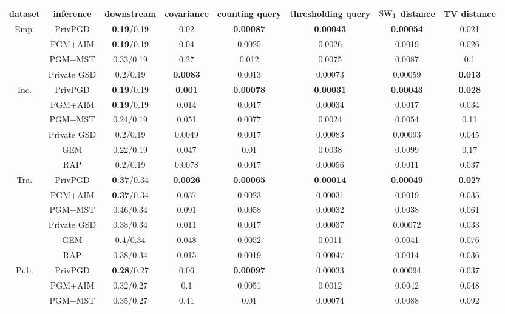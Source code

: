 \begin{table}[ht]
\footnotesize
\centering
\begin{tabular}{cccccccc}
\toprule
dataset & inference & downstream & covariance & counting query & thresholding query & $\text{SW}_1$ distance & TV distance \\
\midrule \multirow{4}{*}{Emp. } & PrivPGD&\textbf{0.19}/0.19 & 0.02 & \textbf{0.00087} & \textbf{0.00043} & \textbf{0.00054} & 0.021 \\
 & PGM+AIM&\textbf{0.19}/0.19 & 0.04 & 0.0025 & 0.0026 & 0.0019 & 0.026 \\
 & PGM+MST&0.33/0.19 & 0.27 & 0.012 & 0.0075 & 0.0087 & 0.1 \\
 & Private GSD&0.2/0.19 & \textbf{0.0083} & 0.0013 & 0.00073 & 0.00059 & \textbf{0.013} \\
\midrule \multirow{6}{*}{Inc. } & PrivPGD&\textbf{0.19}/0.19 & \textbf{0.001} & \textbf{0.00078} & \textbf{0.00031} & \textbf{0.00043} & \textbf{0.028} \\
 & PGM+AIM&\textbf{0.19}/0.19 & 0.014 & 0.0017 & 0.00034 & 0.0017 & 0.034 \\
 & PGM+MST&0.24/0.19 & 0.051 & 0.0077 & 0.0024 & 0.0054 & 0.11 \\
 & Private GSD&0.2/0.19 & 0.0049 & 0.0017 & 0.00083 & 0.00093 & 0.045 \\
 & GEM&0.22/0.19 & 0.047 & 0.01 & 0.0038 & 0.0099 & 0.17 \\
 & RAP&0.2/0.19 & 0.0078 & 0.0017 & 0.00056 & 0.0011 & 0.037 \\
\midrule \multirow{6}{*}{Tra. } & PrivPGD&\textbf{0.37}/0.34 & \textbf{0.0026} & \textbf{0.00065} & \textbf{0.00014} & \textbf{0.00049} & \textbf{0.027} \\
 & PGM+AIM&\textbf{0.37}/0.34 & 0.037 & 0.0023 & 0.00031 & 0.0019 & 0.035 \\
 & PGM+MST&0.46/0.34 & 0.091 & 0.0058 & 0.00032 & 0.0038 & 0.061 \\
 & Private GSD&0.38/0.34 & 0.011 & 0.0017 & 0.00037 & 0.00072 & 0.033 \\
 & GEM&0.4/0.34 & 0.048 & 0.0052 & 0.0011 & 0.0041 & 0.076 \\
 & RAP&0.38/0.34 & 0.015 & 0.0019 & 0.00047 & 0.0014 & 0.036 \\
\midrule \multirow{6}{*}{Pub. } & PrivPGD&\textbf{0.28}/0.27 & 0.06 & \textbf{0.00097} & 0.00033 & 0.00094 & 0.037 \\
 & PGM+AIM&0.32/0.27 & 0.1 & 0.0051 & 0.0012 & 0.0042 & 0.048 \\
 & PGM+MST&0.35/0.27 & 0.41 & 0.01 & 0.00074 & 0.0088 & 0.092 \\

\end{tabular}
\end{table}
